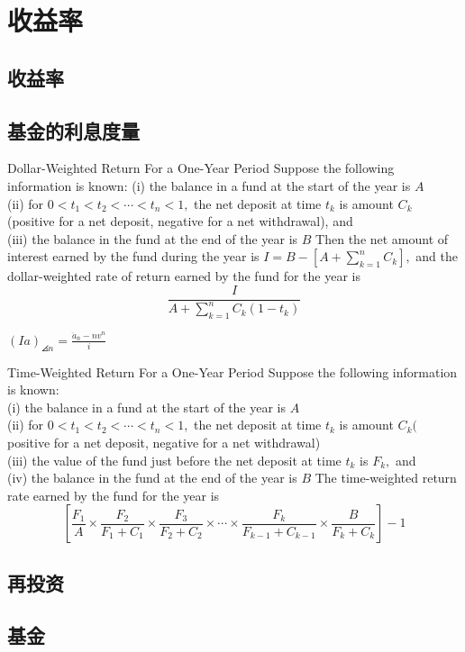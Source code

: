 \chapter{收益率}
\section{收益率}
\section{基金的利息度量}
\begin{definition}{Dollar-Weighted Return For a One-Year Period}
\noindent	Suppose the following information is known:
	(i) the balance in a fund at the start of the year is $A$ \\
	(ii) for $0<t_{1}<t_{2}<\cdots<t_{n}<1,$ the net deposit at time $t_{k}$ is amount $C_{k}$ (positive for a net deposit, negative for a net withdrawal), and \\
	(iii) the balance in the fund at the end of the year is $B$
	Then the net amount of interest earned by the fund during the year is $I=B-\left[A+\sum_{k=1}^{n} C_{k}\right],$ and the dollar-weighted rate of return earned by the fund for the year is
	\[
	\frac{I}{A+\sum_{k=1}^{n} C_{k}\left(1-t_{k}\right)}
	\]
\end{definition}
\begin{remark}
	$(Ia)_{\angles{n}}=\frac{\ddot{a}_{\bar{n}}-n v^{n}}{i}$
\end{remark}
\begin{definition}{Time-Weighted Return For a One-Year Period}
\noinent Suppose the following information is known:\\
	(i) the balance in a fund at the start of the year is $A$\\
	(ii) for $0<t_{1}<t_{2}<\cdots<t_{n}<1,$ the net deposit at time $t_{k}$ is amount $C_{k}($ positive for a net deposit, negative for a net withdrawal)\\
	(iii) the value of the fund just before the net deposit at time $t_{k}$ is $F_{k},$ and\\
	(iv) the balance in the fund at the end of the year is $B$
	The time-weighted return rate earned by the fund for the year is
	\[
	\left[\frac{F_{1}}{A} \times \frac{F_{2}}{F_{1}+C_{1}} \times \frac{F_{3}}{F_{2}+C_{2}} \times \cdots \times \frac{F_{k}}{F_{k-1}+C_{k-1}} \times \frac{B}{F_{k}+C_{k}}\right]-1
	\]	
\end{definition}	
\section{再投资}


\section{基金}